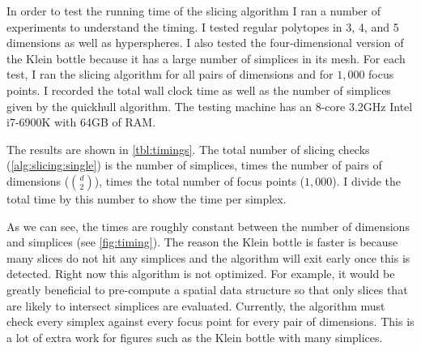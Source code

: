In order to test the running time of the slicing algorithm I ran a number of
experiments to understand the timing. I tested regular polytopes in 3, 4, and
5 dimensions as well as hyperspheres. I also tested the four-dimensional
version of the Klein bottle because it has a large number of simplices in its
mesh. For each test, I ran the slicing algorithm for all pairs of dimensions
and for $1,000$ focus points. I recorded the total wall clock time as well as
the number of simplices given by the quickhull algorithm. The testing machine
has an 8-core 3.2GHz Intel i7-6900K with 64GB of RAM.

The results are shown in \autoref{tbl:timings}. The total number of slicing
checks (\autoref{alg:slicing:single}) is the number of simplices, times the
number of pairs of dimensions ($d \choose 2$), times the total number of focus
points ($1,000$). I divide the total time by this number to show the time per
simplex. 

As we can see, the times are roughly constant between the number of
dimensions and simplices (see \autoref{fig:timing}). The reason the Klein 
bottle is faster is because
many slices do not hit any simplices and the algorithm will exit early
once this is detected. Right now this algorithm is not optimized.
For example, it would be greatly beneficial to pre-compute a spatial data
structure so that only slices that are likely to intersect simplices are
evaluated. Currently, the algorithm must check every simplex against every
focus point for every pair of dimensions. This is a lot of extra work for figures
such as the Klein bottle with many simplices.

